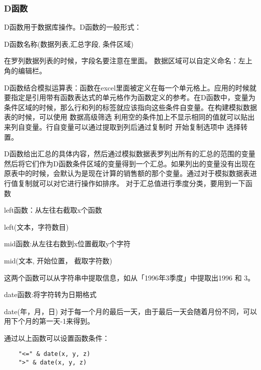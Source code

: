 \documentclass[10pt, a4paper]{article}
\begin{document}
            \subsubsection{D函数}
                D函数用于数据库操作。D函数的一般形式：
                \begin{center}
                D函数名称(数据列表,汇总字段, 条件区域) 
                \end{center}
                在罗列数据列表的时候，字段名要注意在里面。 数据区域可以自定义命名：左上角的编辑栏。

                D函数结合模拟运算表：函数在excel里面被定义在每一个单元格上。应用的时候就要指定是引用带有函数表达式的单元格作为函数定义的参考。在D函数中，变量为条件区域的时候，那么行和列的标签就应该指向这些条件自变量。在构建模拟数据表的时候，可以使用 数据高级筛选 利用空的条件加上不显示相同的值就可以贴出来列自变量。行自变量可以通过提取到列后通过复制时 开始复制选项中 选择转置。

                D函数给出汇总的具体内容，然后通过模拟数据表罗列出所有的汇总的范围的变量然后将它们作为D函数条件区域的变量得到一个汇总。如果列出的变量没有出现在原表中的时候，会默认为是现在计算的销售额的那个变量。通过对于模拟数据表进行值复制就可以对它进行操作如排序。 对于汇总值进行季度分类，要用到一下函数

                left函数：从左往右截取x个函数
                \begin{center}
                    left(文本，字符数目)
                \end{center}

                mid函数:从左往右数到x位置截取y个字符
                \begin{center}
                    mid(文本, 开始位置， 截取字符数)
                \end{center}

                这两个函数可以从字符串中提取信息，如从「1996年3季度」中提取出1996 和 3。

                date函数:将字符转为日期格式
                \begin{center}
                    date(年，月，日)
                    对于每一个月的最后一天，由于最后一天会随着月份不同，可以用下个月的第一天-1来得到。
                \end{center}

                通过以上函数可以设置函数条件：
\begin{lstlisting}
    "<=" & date(x, y, z)
    ">" & date(x, y, z) 
\end{lstlisting}
\end{document}
